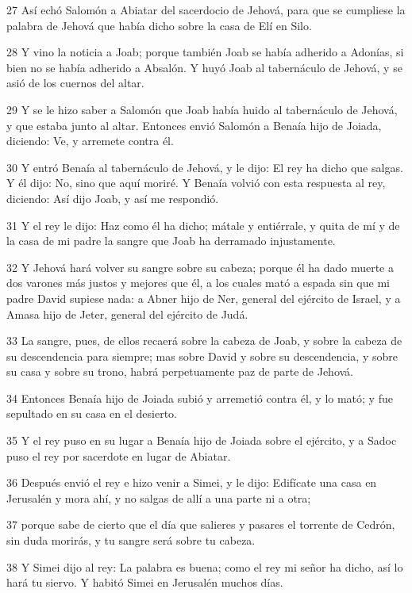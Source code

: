 \par 27 Así echó Salomón a Abiatar del sacerdocio de Jehová, para que se cumpliese la palabra de Jehová que había dicho sobre la casa de Elí en Silo. 
\par 28 Y vino la noticia a Joab; porque también Joab se había adherido a Adonías, si bien no se había adherido a Absalón. Y huyó Joab al tabernáculo de Jehová, y se asió de los cuernos del altar.
\par 29 Y se le hizo saber a Salomón que Joab había huido al tabernáculo de Jehová, y que estaba junto al altar. Entonces envió Salomón a Benaía hijo de Joiada, diciendo: Ve, y arremete contra él.
\par 30 Y entró Benaía al tabernáculo de Jehová, y le dijo: El rey ha dicho que salgas. Y él dijo: No, sino que aquí moriré. Y Benaía volvió con esta respuesta al rey, diciendo: Así dijo Joab, y así me respondió.
\par 31 Y el rey le dijo: Haz como él ha dicho; mátale y entiérrale, y quita de mí y de la casa de mi padre la sangre que Joab ha derramado injustamente. 
\par 32 Y Jehová hará volver su sangre sobre su cabeza; porque él ha dado muerte a dos varones más justos y mejores que él, a los cuales mató a espada sin que mi padre David supiese nada: a Abner hijo de Ner, general del ejército de Israel, y a Amasa hijo de Jeter, general del ejército de Judá.
\par 33 La sangre, pues, de ellos recaerá sobre la cabeza de Joab, y sobre la cabeza de su descendencia para siempre; mas sobre David y sobre su descendencia, y sobre su casa y sobre su trono, habrá perpetuamente paz de parte de Jehová.
\par 34 Entonces Benaía hijo de Joiada subió y arremetió contra él, y lo mató; y fue sepultado en su casa en el desierto.
\par 35 Y el rey puso en su lugar a Benaía hijo de Joiada sobre el ejército, y a Sadoc puso el rey por sacerdote en lugar de Abiatar.
\par 36 Después envió el rey e hizo venir a Simei, y le dijo: Edifícate una casa en Jerusalén y mora ahí, y no salgas de allí a una parte ni a otra;
\par 37 porque sabe de cierto que el día que salieres y pasares el torrente de Cedrón, sin duda morirás, y tu sangre será sobre tu cabeza.
\par 38 Y Simei dijo al rey: La palabra es buena; como el rey mi señor ha dicho, así lo hará tu siervo. Y habitó Simei en Jerusalén muchos días.
